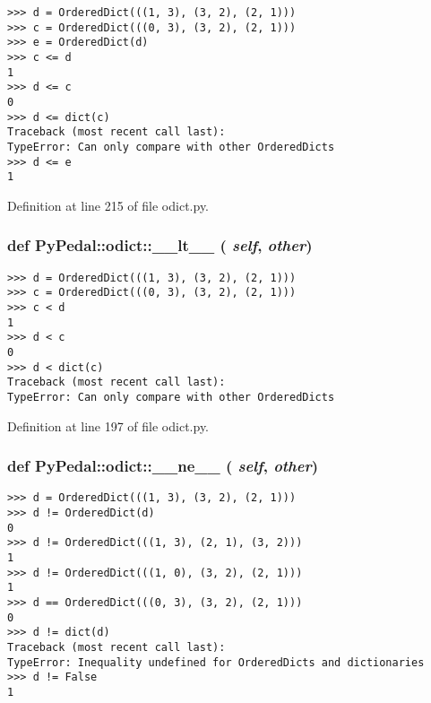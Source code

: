 \footnotesize\begin{verbatim}
>>> d = OrderedDict(((1, 3), (3, 2), (2, 1)))
>>> c = OrderedDict(((0, 3), (3, 2), (2, 1)))
>>> e = OrderedDict(d)
>>> c <= d
1
>>> d <= c
0
>>> d <= dict(c)
Traceback (most recent call last):
TypeError: Can only compare with other OrderedDicts
>>> d <= e
1
\end{verbatim}
\normalsize
 

Definition at line 215 of file odict.py.\hypertarget{namespacePyPedal_1_1odict_6d3f68fb4b339d6999c8de0b683ac30c}{
\subsubsection{\setlength{\rightskip}{0pt plus 5cm}def PyPedal::odict::\_\-\_\-lt\_\-\_\- ( {\em self},  {\em other})}}
\label{namespacePyPedal_1_1odict_6d3f68fb4b339d6999c8de0b683ac30c}




\footnotesize\begin{verbatim}
>>> d = OrderedDict(((1, 3), (3, 2), (2, 1)))
>>> c = OrderedDict(((0, 3), (3, 2), (2, 1)))
>>> c < d
1
>>> d < c
0
>>> d < dict(c)
Traceback (most recent call last):
TypeError: Can only compare with other OrderedDicts
\end{verbatim}
\normalsize
 

Definition at line 197 of file odict.py.\hypertarget{namespacePyPedal_1_1odict_4a516999d2abed037fdb7842f93b003b}{
\subsubsection{\setlength{\rightskip}{0pt plus 5cm}def PyPedal::odict::\_\-\_\-ne\_\-\_\- ( {\em self},  {\em other})}}
\label{namespacePyPedal_1_1odict_4a516999d2abed037fdb7842f93b003b}




\footnotesize\begin{verbatim}
>>> d = OrderedDict(((1, 3), (3, 2), (2, 1)))
>>> d != OrderedDict(d)
0
>>> d != OrderedDict(((1, 3), (2, 1), (3, 2)))
1
>>> d != OrderedDict(((1, 0), (3, 2), (2, 1)))
1
>>> d == OrderedDict(((0, 3), (3, 2), (2, 1)))
0
>>> d != dict(d)
Traceback (most recent call last):
TypeError: Inequality undefined for OrderedDicts and dictionaries
>>> d != False
1
\end{verbatim}
\normalsize
 

